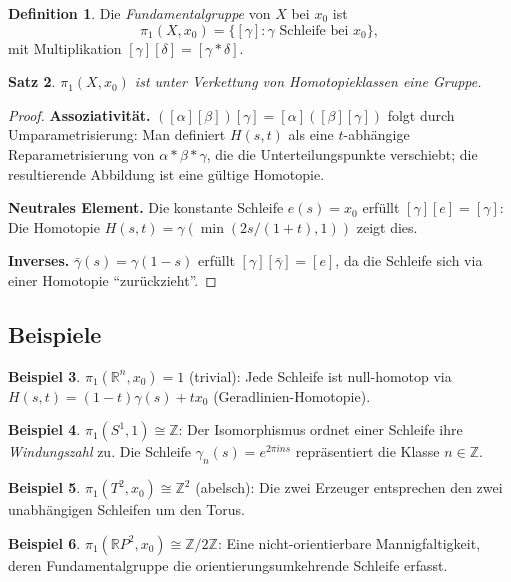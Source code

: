 \documentclass[12pt,a4paper]{amsart}
\newtheorem{theorem}{Satz}[section]
\theoremstyle{definition}
\newtheorem{definition}[theorem]{Definition}
\newtheorem{example}[theorem]{Beispiel}
\begin{document}
\begin{definition}
Die \emph{Fundamentalgruppe} von $X$ bei $x_0$ ist
\[
  \pi_1(X, x_0) = \{ [\gamma] : \gamma \text{ Schleife bei } x_0 \},
\]
mit Multiplikation $[\gamma][\delta] = [\gamma * \delta]$.
\end{definition}

\begin{theorem}
$\pi_1(X, x_0)$ ist unter Verkettung von Homotopieklassen eine Gruppe.
\end{theorem}
\begin{proof}
\textbf{Assoziativit\"at.} $([\alpha][\beta])[\gamma] = [\alpha]([\beta][\gamma])$
folgt durch Umparametrisierung: Man definiert $H(s,t)$ als eine
$t$-abh\"angige Reparametrisierung von $\alpha * \beta * \gamma$, die die
Unterteilungspunkte verschiebt; die resultierende Abbildung ist eine g\"ultige
Homotopie.

\textbf{Neutrales Element.} Die konstante Schleife $e(s) = x_0$ erf\"ullt
$[\gamma][e] = [\gamma]$: Die Homotopie $H(s,t) = \gamma(\min(2s/(1+t),1))$
zeigt dies.

\textbf{Inverses.} $\bar{\gamma}(s) = \gamma(1-s)$ erf\"ullt
$[\gamma][\bar{\gamma}] = [e]$, da die Schleife sich via einer Homotopie
``zur\"uckzieht''.
\end{proof}

\subsection{Beispiele}

\begin{example}
$\pi_1(\mathbb{R}^n, x_0) = 1$ (trivial): Jede Schleife ist null-homotop via
$H(s,t) = (1-t)\gamma(s) + t x_0$ (Geradlinien-Homotopie).
\end{example}

\begin{example}
$\pi_1(S^1, 1) \cong \mathbb{Z}$: Der Isomorphismus ordnet einer Schleife
ihre \emph{Windungszahl} zu. Die Schleife $\gamma_n(s) = e^{2\pi i n s}$
repr\"asentiert die Klasse $n \in \mathbb{Z}$.
\end{example}

\begin{example}
$\pi_1(T^2, x_0) \cong \mathbb{Z}^2$ (abelsch): Die zwei Erzeuger entsprechen
den zwei unabh\"angigen Schleifen um den Torus.
\end{example}

\begin{example}
$\pi_1(\mathbb{R}P^2, x_0) \cong \mathbb{Z}/2\mathbb{Z}$: Eine nicht-orientierbare
Mannigfaltigkeit, deren Fundamentalgruppe die orientierungsumkehrende Schleife
erfasst.
\end{example}
\end{document}
